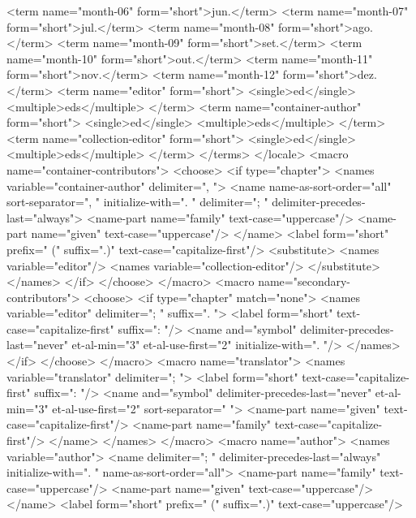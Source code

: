       <term name="month-06" form="short">jun.</term>
      <term name="month-07" form="short">jul.</term>
      <term name="month-08" form="short">ago.</term>
      <term name="month-09" form="short">set.</term>
      <term name="month-10" form="short">out.</term>
      <term name="month-11" form="short">nov.</term>
      <term name="month-12" form="short">dez.</term>
      <term name="editor" form="short">
        <single>ed</single>
        <multiple>eds</multiple>
      </term>
      <term name="container-author" form="short">
        <single>ed</single>
        <multiple>eds</multiple>
      </term>
      <term name="collection-editor" form="short">
        <single>ed</single>
        <multiple>eds</multiple>
      </term>
    </terms>
  </locale>
  <macro name="container-contributors">
    <choose>
      <if type="chapter">
        <names variable="container-author" delimiter=", ">
          <name name-as-sort-order="all" sort-separator=", " initialize-with=". " delimiter="; " delimiter-precedes-last="always">
            <name-part name="family" text-case="uppercase"/>
            <name-part name="given" text-case="uppercase"/>
          </name>
          <label form="short" prefix=" (" suffix=".)" text-case="capitalize-first"/>
          <substitute>
            <names variable="editor"/>
            <names variable="collection-editor"/>
          </substitute>
        </names>
      </if>
    </choose>
  </macro>
  <macro name="secondary-contributors">
    <choose>
      <if type="chapter" match="none">
        <names variable="editor" delimiter="; " suffix=". ">
          <label form="short" text-case="capitalize-first" suffix=": "/>
          <name and="symbol" delimiter-precedes-last="never" et-al-min="3" et-al-use-first="2" initialize-with=". "/>
        </names>
      </if>
    </choose>
  </macro>
  <macro name="translator">
    <names variable="translator" delimiter=";  ">
      <label form="short" text-case="capitalize-first" suffix=": "/>
      <name and="symbol" delimiter-precedes-last="never" et-al-min="3" et-al-use-first="2" sort-separator=" ">
        <name-part name="given" text-case="capitalize-first"/>
        <name-part name="family" text-case="capitalize-first"/>
      </name>
    </names>
  </macro>
  <macro name="author">
    <names variable="author">
      <name delimiter="; " delimiter-precedes-last="always" initialize-with=". " name-as-sort-order="all">
        <name-part name="family" text-case="uppercase"/>
        <name-part name="given" text-case="uppercase"/>
      </name>
      <label form="short" prefix=" (" suffix=".)" text-case="uppercase"/>
